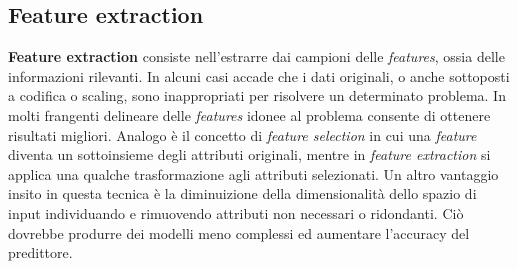 \subsection{Feature extraction}
\textbf{Feature extraction} consiste nell'estrarre dai campioni delle \textit{features}, ossia delle informazioni rilevanti. In alcuni casi accade che i dati originali, o anche sottoposti a codifica o scaling, sono inappropriati per risolvere un determinato problema. In molti frangenti delineare delle \textit{features} idonee al problema consente di ottenere risultati migliori. Analogo è il concetto di \textit{feature selection} in cui una \textit{feature} diventa un sottoinsieme degli attributi originali, mentre in \textit{feature extraction} si applica una qualche trasformazione agli attributi selezionati.
Un altro vantaggio insito in questa tecnica è la diminuizione della dimensionalità dello spazio di input individuando e rimuovendo attributi non necessari o ridondanti. Ciò dovrebbe produrre dei modelli meno complessi ed aumentare l'accuracy del predittore.

